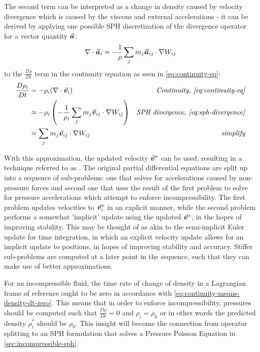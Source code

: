 The second term can be interpreted as a change in density caused by velocity divergence which is caused by the viscous and external accelerations - it can be derived by applying one possible SPH discretization of the divergence operator for a vector quantity $\vec{\bm{a}}$\autocite*{2014-sph-sruvey-eurographics}:
\begin{equation}\label{eq:sph-divergence}
  \nabla \cdot \vec{\bm{a}}_i = -\frac{1}{\rho}\sum_j m_j\vec{\bm{a}}_{ij}\cdot\nabla W_{ij}
\end{equation}
to the $\frac{D\rho}{D t}$ term in the continuity equation as seen in \ref{eq:continuity-eq}:
\begin{align}
  \frac{D\rho_i}{D t} & = -\rho_i(\nabla\cdot \vek{v}_i)                                                      & \textit{Continuity, \autoref{eq:continuity-eq}}      \\
                      & \approx -\rho_i\left(-\frac{1}{\rho_i}\sum_j m_j\vek{v}_{ij}\cdot\nabla W_{ij}\right) & \textit{SPH divergence, \autoref{eq:sph-divergence}} \\
                      & = \sum_j m_j\vek{v}_{ij}\cdot\nabla W_{ij}                                            & \textit{simplify}
\end{align}



With this approximation, the updated velocity $\vec{\bm{v}}^*$ can be used, resulting in a technique referred to as \autocite{tutorial}. The original partial differential equations are split up into a sequence of sub-problems: one that solves for accelerations caused by non-pressure forces and second one that uses the result of the first problem to solve for pressure accelerations which attempt to enforce incompressibility\autocite*{tutorial}. The first problem updates velocities to $\vec{\bm{v}}_i^*$ in an explicit manner, while the second problem performs a somewhat 'implicit' update using the updated $\vec{\bm{v}}^*$, in the hopes of improving stability\autocite*{tutorial}. This may be thought of as akin to the semi-implicit Euler update for time integration, in which an explicit velocity update allows for an implicit update to positions, in hopes of improving stability and accuracy. Stiffer sub-problems are computed at a later point in the sequence, such that they can make use of better approximations\autocite*{tutorial}.

For an incompressible fluid, the time rate of change of density in a Lagrangian frame of reference ought to be zero in accordance with \autoref{eq:continuity-means-density-dt-zero}. This means that in order to enforce incompressibility, pressures should be computed such that $\frac{D\rho}{D t}=0$ and $\rho_i = \rho_0$ or in other words the predicted density $\rho_i^*$ should be $\rho_0$. This insight will become the connection from operator splitting to an SPH formulation that solves a Pressure Poisson Equation in \autoref{sec:incompressible-sph}.


